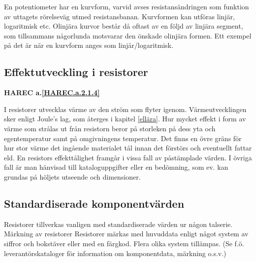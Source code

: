 En potentiometer har en kurvform, varvid avses resistansändringen som funktion
av uttagets rörelseväg utmed resistansbanan. Kurvformen kan utföras linjär,
logaritmisk etc. Olinjära kurvor består då oftast av en följd av linjära
segment, som tillsammans någorlunda motsvarar den önskade olinjära formen. Ett
exempel på det är när en kurvform anges som linjär/logaritmisk.

\subsection{Effektutveckling i resistorer}
\textbf{HAREC a.\ref{HAREC.a.2.1.4}\label{myHAREC.a.2.1.4}}

I resistorer utvecklas värme av den ström som flyter igenom. Värmeutvecklingen
sker enligt Joule's lag, som återges i kapitel \ref{ellära}. Hur mycket effekt i form av
värme som strålas ut från resistorn beror på storleken på dess yta och
egentemperatur samt på omgivningens temperatur. Det finns en övre gräns för hur
stor värme det ingående materialet tål innan det förstörs och eventuellt fattar
eld. En resistors effekttålighet framgår i vissa fall av påstämplade värden.
I övriga fall är man hänvisad till kataloguppgifter eller en bedömning, som ev.
kan grundas på höljets utseende och dimensioner.

\subsection{Standardiserade komponentvärden}

Resistorer tillverkas vanligen med standardiserade värden ur någon talserie.
Märkning av resistorer Resistorer märkas med huvuddata enligt något system av
siffror och bokstäver eller med en färgkod. Flera olika system tillämpas.
(Se f.ö. leverantörskataloger för information om komponentdata, märkning o.s.v.)
